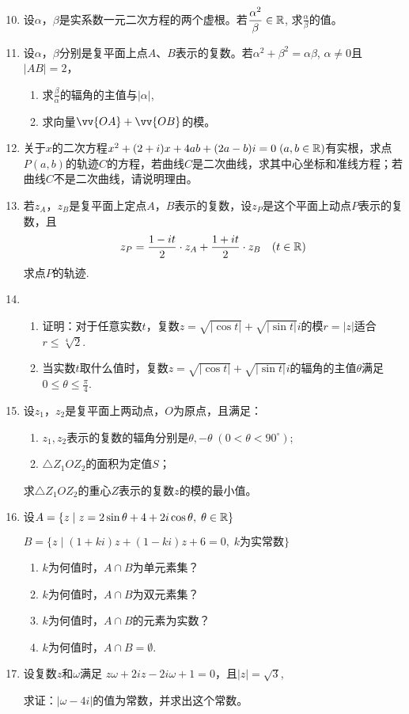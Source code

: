 \begin{enumerate}\setcounter{enumi}{9}
    \item 设$\alpha$，$\beta$是实系数一元二次方程的两个虚根。若$\dfrac{\alpha^2}{\beta}\in\mathbb{R}$, 求$\frac{\alpha}{\beta}$的值。
    \item 设$\alpha$，$\beta$分别是复平面上点$A$、$B$表示的复数。若$\alpha^2+\beta^2=\alpha\beta$, $\alpha\ne 0$且$|AB|=2$，
\begin{enumerate}[(1)]
    \item 求$\frac{\beta}{\alpha}$的辐角的主值与$|\alpha|$,
    \item 求向量$\vv{OA}+\vv{OB}$的模。
\end{enumerate}

    \item 关于$x$的二次方程$x^2+(2+i)x+4ab+(2a-b)i=0\; (a,b\in\mathbb{R})$有实根，求点$P(a,b)$的轨迹$C$的方程，若曲线$C$是二次曲线，求其中心坐标和准线方程；若曲线$C$不是二次曲线，请说明理由。
    \item 若$z_A$，$z_B$是复平面上定点$A$，$B$表示的复数，设$z_P$是这个平面上动点$P$表示的复数，且
\[z_P=\dfrac{1-it}{2}\cdot z_A+\dfrac{1+it}{2}\cdot z_B\quad (t\in\mathbb{R})\]
求点$P$的轨迹.

\item \begin{enumerate}[(1)]
    \item 证明：对于任意实数$t$，复数$z=\sqrt{|\cos t|}+\sqrt{|\sin t|}i$的模$r=|z|$适合$r\le \sqrt[4]{2}$.
    \item 当实数$t$取什么值时，复数$z=\sqrt{|\cos t|}+\sqrt{|\sin t|}i$的辐角的主值$\theta$满足$0\le \theta\le \frac{\pi}{4}$.
\end{enumerate}

\item 设$z_1$，$z_2$是复平面上两动点，$O$为原点，且满足：
\begin{enumerate}[(1)]
\item $z_1,z_2$表示的复数的辐角分别是$\theta,-\theta\; (0<\theta<90^{\circ})$;
\item $\triangle Z_1OZ_2$的面积为定值$S$；
\end{enumerate}
求$\triangle Z_1OZ_2$的重心$Z$表示的复数$z$的模的最小值。
\item 设$A=\{z\mid z=2\sin\theta+4+2i\cos\theta,\; \theta\in\mathbb{R}\}$

$B=\{z\mid (1+ki)z+(1-ki)z+6=0,\; k\text{为实常数}\}$
\begin{enumerate}[(1)]
\item $k$为何值时，$A\cap B$为单元素集？
\item $k$为何值时，$A\cap B$为双元素集？
\item $k$为何值时，$A\cap B$的元素为实数？
\item $k$为何值时，$A\cap B=\emptyset$.
\end{enumerate}


\item 设复数$z$和$\omega$满足
$z\omega +2iz-2i\omega +1=0$，且$|z|=\sqrt{3}$, 

求证：$|\omega-4i|$的值为常数，并求出这个常数。



\end{enumerate}
